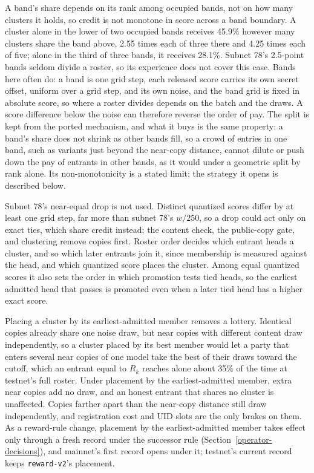 A band's share depends on its rank among occupied bands, not on how many
clusters it holds, so credit is not monotone in score across a band boundary. A
cluster alone in the lower of two occupied bands receives 45.9\% however many
clusters share the band above, 2.55 times each of three there and 4.25 times
each of five; alone in the third of three bands, it receives 28.1\%. Subnet
78's 2.5-point bands seldom divide a roster, so its experience does not cover
this case. Bands here often do: a band is one grid step, each released score
carries its own secret offset, uniform over a grid step, and its own noise, and
the band grid is fixed in absolute score, so where a roster divides depends on
the batch and the draws. A score
difference below the noise can therefore reverse the order of pay. The split is
kept from the ported mechanism, and what it buys is the same property: a band's
share does not shrink as other bands fill, so a crowd of entries in one band,
such as variants just beyond the near-copy distance, cannot dilute or push down
the pay of entrants in other bands, as it would under a geometric split by rank
alone. Its non-monotonicity is a stated limit; the strategy it opens is
described below.

Subnet 78's near-equal drop is not used. Distinct quantized scores differ by at
least one grid step, far more than subnet 78's \(w/250\), so a drop could act
only on exact ties, which share credit instead; the content check, the
public-copy gate, and clustering remove copies first. Roster order decides
which entrant heads a cluster, and so which later entrants join it, since
membership is measured against the head, and which quantized score places the
cluster. Among equal quantized scores it also sets the order in which
promotion tests tied heads, so the earliest admitted head that passes is
promoted even when a later tied head has a higher exact score.

Placing a cluster by its earliest-admitted member removes a lottery. Identical
copies already share one noise draw, but near copies with different content
draw independently, so a cluster placed by its best member would let a party
that enters several near copies of one model take the best of their draws
toward the cutoff, which an entrant equal to \(R_k\) reaches alone about 35\%
of the time at testnet's full roster. Under placement by the earliest-admitted
member, extra near copies add no draw, and an honest entrant that shares no
cluster is unaffected. Copies farther apart than the near-copy distance still
draw independently, and registration cost and UID slots are the only brakes on
them. As a reward-rule change, placement by the earliest-admitted member
takes effect only through a fresh record under the successor rule
(Section~\ref{operator-decisions}), and mainnet's first record opens under
it; testnet's current record keeps \texttt{reward-v2}'s placement.

